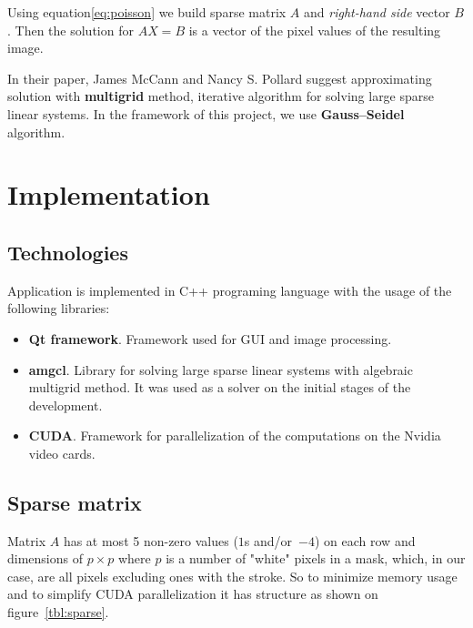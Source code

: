 \documentclass[hidelinks, english]{report}
\begin{document}
Using equation\eqref{eq:poisson} we build sparse matrix $A$ and \textit{right-hand side} vector $B$. Then the solution
for $AX=B$ is a vector of the pixel values of the resulting image.

In their paper\cite{gradient}, James McCann and Nancy S. Pollard suggest approximating solution with \textbf{multigrid}
method, iterative algorithm for solving large sparse linear systems. In the framework of this project, we use
\textbf{Gauss–Seidel} algorithm.

\section{Implementation}

\subsection{Technologies}

Application is implemented in C++ programing language with the usage of the following libraries:

\begin{itemize}
    \item \textbf{Qt framework}. Framework used for GUI and image processing.
    \item \textbf{amgcl}. Library for solving large sparse linear systems with algebraic multigrid method. It was used
    as a solver on the initial stages of the development.
    \item \textbf{CUDA}. Framework for parallelization of the computations on the Nvidia video cards.
\end{itemize}


\subsection{Sparse matrix}

Matrix $A$ has at most 5 non-zero values ($1$s and/or~$-4$) on each row and dimensions of $p \times p$ where $p$ is
a number of "white" pixels in a mask, which, in our case, are all pixels excluding ones with the stroke. So to minimize
memory usage and to simplify CUDA parallelization it has structure as shown on figure~\ref{tbl:sparse}.
\end{document}
